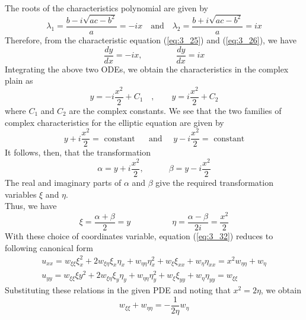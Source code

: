 \documentclass[11pt]{report}
\newcommand{\NI}{\noindent}
\newcommand{\sps}{\\[0.2cm]}
\newcommand{\refn}[1]{(\ref{#1})}
\newcommand{\refx}[1]{\refn{eq:#1}}
\begin{document}
	\NI The roots of the characteristics polynomial are given by
	\begin{equation*}
		\lambda_1 = \frac{b-i\sqrt{ac-b^2}}{a} =-ix \text{ ~~and~~ } \lambda_2=\frac{b+i\sqrt{ac-b^2}}{a}=ix\label{ex:3_4_3} 
	\end{equation*}
	Therefore, from the characteristic equation \refx{3_25} and \refx{3_26}, we have
	\begin{equation*}
		\frac{dy}{dx}=-ix,\qquad\qquad \frac{dy}{dx} = ix\label{ex:3_4_4}
	\end{equation*}
	Integrating the above two ODEs, we obtain the characteristics in the complex plain as
	\begin{equation*}
		y = -i\frac{x^2}{2}+C_1\quad , \qquad y=i\frac{x^2}{2}+C_2\label{ex:3_4_5} 
	\end{equation*}
	where $C_1$ and $C_2$ are the complex constants. We see that the two families of complex characteristics for the elliptic equation are given by 
	\begin{equation*}
		y + i\frac{x^2}{2} = \text{ constant }\quad \text{ and } \quad y- i\frac{x^2}{2}= \text{ constant}\label{ex:3_4_6} 
	\end{equation*}
	It follows, then, that the transformation
	\begin{equation*}
			\alpha = y + i\frac{x^2}{2}, \qquad \quad \beta = y- i\frac{x^2}{2}\label{ex:3_4_7} 
	\end{equation*}
	The real and imaginary parts of $\alpha$ and $\beta$ give the required transformation variables $\xi$ and $\eta$.\sps
	Thus, we have
	\begin{equation*}
		\xi = \frac{\alpha + \beta}{2} = y \qquad\qquad\quad \eta = \frac{\alpha - \beta}{2i} =\frac{x^2}{2} \label{ex:3_4_8} 
	\end{equation*}
	With these choice of coordinates variable, equation \refx{3_32} reduces to following canonical form
	\begin{equation*}
		\begin{array}{l}
			u_{xx} = w_{\xi\xi}\xi_x^2 + 2w_{\xi\eta}\xi_x\eta_x + w_{\eta\eta}\eta_x^2 + w_{\xi}\xi_{xx} + w_\eta\eta_{xx} = x^2w_{\eta\eta} + w_\eta\\
			u_{yy} = w_{\xi\xi}\xi y^2 + 2w_{\xi\eta}\xi_y \eta_y + w_{\eta\eta}\eta_y^2 + w_{\xi}\xi_{yy} + w_\eta\eta_{yy}=w_{\xi\xi}
		\end{array}\label{ex:3_4_9}
	\end{equation*}
	Substituting these relations in the given PDE and noting that $x^2=2\eta$, we obtain
	\begin{equation*}
		w_{\xi\xi} + w_{\eta\eta} = - \frac{1}{2\eta}w_\eta\label{ex:3_4_10}
	\end{equation*}
\end{document}
